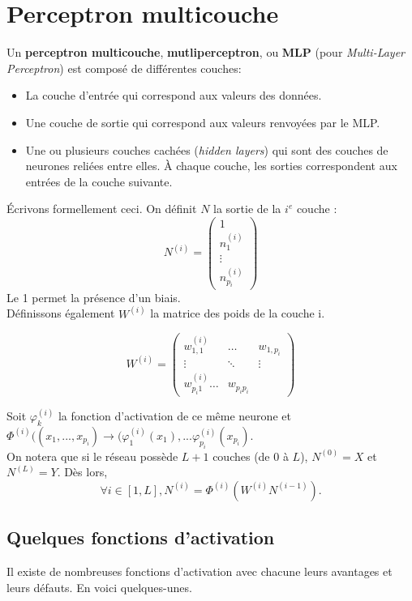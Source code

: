 \section{Perceptron multicouche}
Un \textbf{perceptron multicouche}, \textbf{mutliperceptron}, ou \textbf{MLP} (pour \textit{Multi-Layer Perceptron}) est composé de différentes couches: \begin{itemize}
\item La couche d'entrée qui correspond aux valeurs des données.
\item Une couche de sortie qui correspond aux valeurs renvoyées par le MLP.
\item Une ou plusieurs couches cachées (\textit{hidden layers}) qui sont des couches de neurones reliées entre elles. À chaque couche, les sorties correspondent aux entrées de la couche suivante.

\end{itemize}

Écrivons formellement ceci. On définit $N$ la sortie de la $i^e$ couche :
$$N^{(i)}  = \begin{pmatrix} 1\\ n_1^{(i)}\\ \vdots \\ n_{p_i}^{(i)} \end{pmatrix}$$  Le 1 permet la présence d'un biais.\\ 
Définissons également $W^{(i)}$ la matrice des poids de la couche i.

$$W^{(i)} = \begin{pmatrix} w_{1,1}^{(i)}& \hdots & w_{1, p_i} \\  \vdots & \ddots &  \vdots \\ w_{p_i1}^{(i)}  \hdots & w_{p_ip_i} \end{pmatrix}$$

Soit $\varphi_k^{(i)}$ la fonction d'activation de ce même neurone et $\Phi^{(i)}((x_1,...,x_{p_i}) \to (\varphi_1^{(i)}(x_1), ... \varphi^{(i)}_{p_i}(x_{p_i})$.\\

On notera que si le réseau possède $L+1$ couches (de $0$ à $ L$), $N^{(0)} = X$ et $N^{(L)} = Y$. Dès lors, $$\forall i \in [1,L], N^{(i)} = \Phi^{(i)}(W^{(i)}N^{(i-1)}). $$





\subsection{Quelques fonctions d'activation}
Il existe de nombreuses fonctions d'activation avec chacune leurs avantages et leurs défauts. En voici quelques-unes.


